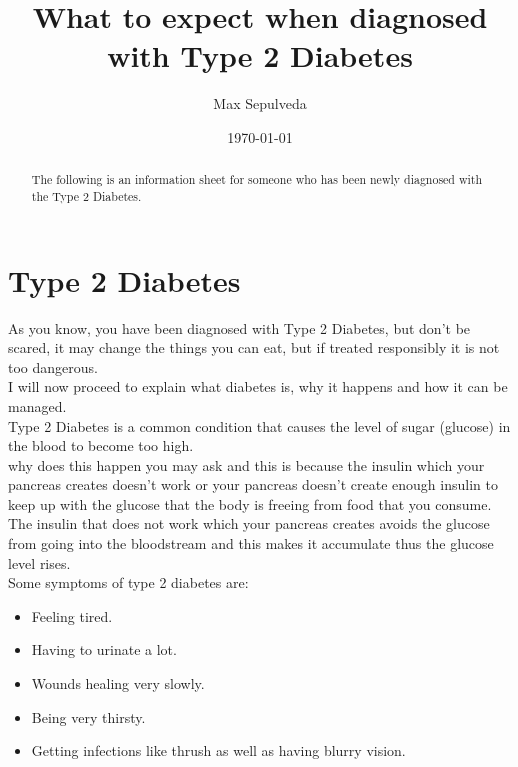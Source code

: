 \documentclass[letterpaper,12pt]{article}
\begin{document}
\title{What to expect when diagnosed with Type 2 Diabetes}
\author{Max Sepulveda}
\date{\today}
\maketitle

\begin{abstract}
The following is an information sheet for someone who has been newly diagnosed with the Type 2 Diabetes.

\end{abstract}

\section{Type 2 Diabetes}

As you know, you have been diagnosed with Type 2 Diabetes, but don't be scared, it may change the things you can eat, but if treated responsibly it is not too dangerous.\\

I will now proceed to explain what diabetes is, why it happens and how it can be managed.\\

Type 2 Diabetes is a common condition that causes the level of sugar (glucose) in the blood to become too high.\\

why does this happen you may ask and this is because the insulin which your pancreas creates doesn't work or your pancreas doesn't create enough insulin to keep up with the glucose that the body is freeing from food that you consume.\\

The insulin that does not work which your pancreas creates avoids the glucose from going into the bloodstream and this makes it  accumulate thus the glucose level rises.\\

Some symptoms of type 2 diabetes are:
\begin{itemize}
 \item Feeling tired.
 \item Having to urinate a lot.
 \item Wounds healing very slowly.
 \item Being very thirsty.
 \item Getting infections like thrush as well as having blurry vision.
\end{itemize}
\end{document}
